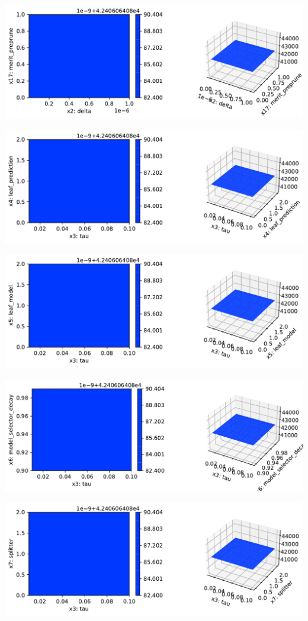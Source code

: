 \documentclass[
  letterpaper,
  DIV=11,
  numbers=noendperiod]{scrreprt}
\begin{document}
\includegraphics{024_spot_hpt_river_friedman_hatr_files/figure-pdf/cell-42-output-40.pdf}

\includegraphics{024_spot_hpt_river_friedman_hatr_files/figure-pdf/cell-42-output-41.pdf}

\includegraphics{024_spot_hpt_river_friedman_hatr_files/figure-pdf/cell-42-output-42.pdf}

\includegraphics{024_spot_hpt_river_friedman_hatr_files/figure-pdf/cell-42-output-43.pdf}

\includegraphics{024_spot_hpt_river_friedman_hatr_files/figure-pdf/cell-42-output-44.pdf}
\end{document}
